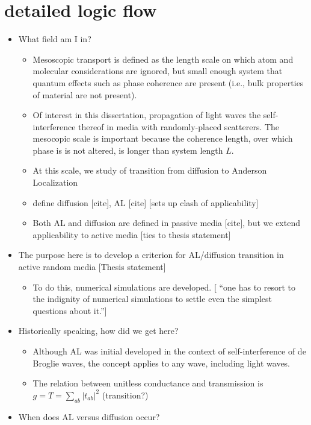 \documentclass[pdftex]{article}
\begin{document}
\section{detailed logic flow}
\begin{itemize}
 \item What field am I in?
 \begin{itemize}
  \item Mesoscopic transport is defined \cite{2005_Duan_Guojun} %
   as the length scale on which atom and molecular considerations are ignored, but small enough system that quantum effects such as phase coherence are present (i.e., bulk properties of material are not present).  
  \item Of interest in this dissertation, propagation of light waves the self-interference thereof in media with randomly-placed scatterers. The mesocopic scale is important because the coherence length, over which phase is is not altered, is longer than system length $L$.
  \item At this scale, we study of transition from diffusion to Anderson Localization 
  \item define diffusion [cite], AL [cite] [sets up clash of applicability]
  \item Both AL and diffusion are defined in passive media [cite], but we extend applicability to active media [ties to thesis statement]
 \end{itemize}
 \item The purpose here is to develop a criterion for AL/diffusion transition in active random media [Thesis statement]
 \begin{itemize}
  \item To do this, numerical simulations are developed. [\cite{1977_Anderson_nobel} ``one has to resort to the indignity of numerical simulations to settle even the simplest questions about it.'']
 \end{itemize}
 \item Historically speaking, how did we get here?
 \begin{itemize}
  \item Although AL was initial developed in the context of self-interference of de Broglie waves, the concept applies to any wave, including light waves.
  \item The relation between unitless conductance and transmission is $g=T=\sum_{ab} |t_{ab}|^2$ \cite{1998_Brouwer}
 (transition?)
 \end{itemize}
 \item When does AL versus diffusion occur?

\end{itemize}
\end{document}
